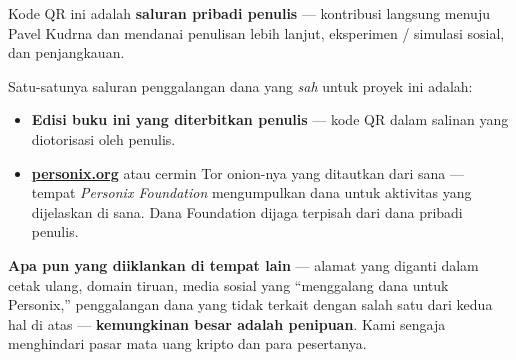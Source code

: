 \begin{minipage}[t]{0.60\textwidth}
\vspace{0pt}
\begin{mdframed}[
  linewidth=0.7pt,roundcorner=5pt,
  innerleftmargin=10pt,innerrightmargin=10pt,
  innertopmargin=8pt,innerbottommargin=8pt,
  skipabove=0pt,skipbelow=0pt,
  linecolor=cbwarning!50,backgroundcolor=cbwarning!5,
  nobreak=true,
  needspace=4\baselineskip,
]
\footnotesize
Kode QR ini adalah \textbf{saluran pribadi penulis} --- kontribusi langsung menuju Pavel Kudrna dan mendanai penulisan lebih lanjut, eksperimen / simulasi sosial, dan penjangkauan.

\smallskip
Satu-satunya saluran penggalangan dana yang \emph{sah} untuk proyek ini adalah:

\smallskip
\begin{itemize}
\setlength{\itemsep}{0pt}
\setlength{\topsep}{0pt}
\item \textbf{Edisi buku ini yang diterbitkan penulis} --- kode QR dalam salinan yang diotorisasi oleh penulis.
\item \href{https://personix.org}{\textbf{personix.org}} atau cermin Tor onion-nya yang ditautkan dari sana --- tempat \emph{Personix Foundation} mengumpulkan dana untuk aktivitas yang dijelaskan di sana. Dana Foundation dijaga terpisah dari dana pribadi penulis.
\end{itemize}

\smallskip
\textbf{Apa pun yang diiklankan di tempat lain} --- alamat yang diganti dalam cetak ulang, domain tiruan, media sosial yang ``menggalang dana untuk Personix,'' penggalangan dana yang tidak terkait dengan salah satu dari kedua hal di atas --- \textbf{kemungkinan besar adalah penipuan}. Kami sengaja menghindari pasar mata uang kripto dan para pesertanya.
\end{mdframed}
\end{minipage}

\clearpage
